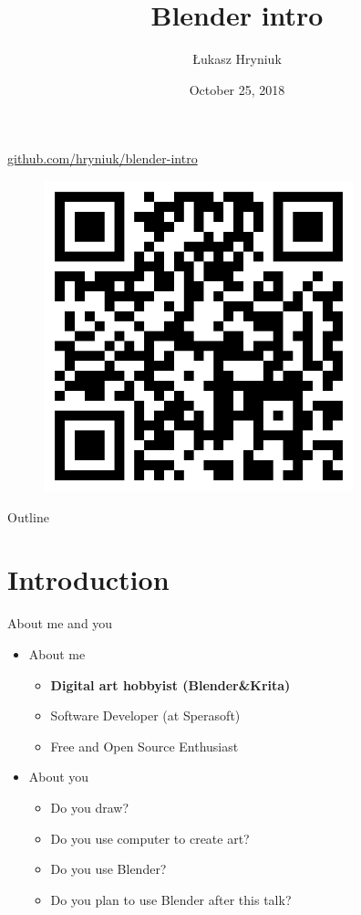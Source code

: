 \documentclass{beamer}
\title[Blender Intro]{Blender intro}
\author{Łukasz Hryniuk}
\date{October 25, 2018}
\begin{document}
\begin{frame}
  \titlepage
  \centering\href{https://github.com/hryniuk/blender-intro}{github.com/hryniuk/blender-intro}
\end{frame}

\begin{frame}
\begin{figure}
	\includegraphics[keepaspectratio,height=9cm]{blender-intro.png}
\end{figure}
\end{frame}

\begin{frame}{Outline}
  \tableofcontents
\end{frame}

\section{Introduction}

\begin{frame}{About me and you}

\begin{itemize}
\item About me
	\begin{itemize}
		\item \textbf{Digital art hobbyist (Blender\&Krita)}
		\item Software Developer (at Sperasoft)
		\item Free and Open Source Enthusiast
	\end{itemize}
\item About you
	\begin{itemize}
		\item Do you draw?
		\item Do you use computer to create art?
		\item Do you use Blender?
		\item Do you plan to use Blender after this talk?
	\end{itemize}
\end{itemize}

\end{frame}
\end{document}

